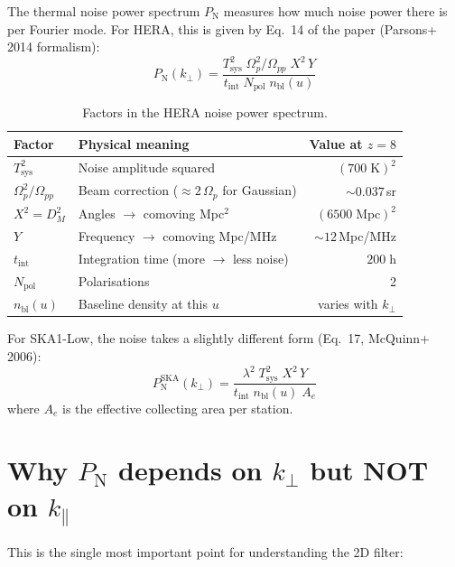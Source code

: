 \documentclass[11pt,a4paper]{article}
\newcommand{\kperp}{k_\perp}
\newcommand{\kpar}{k_\parallel}
\newcommand{\Tsys}{T_\mathrm{sys}}
\newcommand{\Pnoise}{P_\mathrm{N}}
\newcommand{\nbl}{n_\mathrm{bl}}
\begin{document}
The thermal noise power spectrum $\Pnoise$ measures how much noise power there is per Fourier mode. For HERA, this is given by Eq.~14 of the paper (Parsons+ 2014 formalism):
\begin{equation}\label{eq:pnoise}
    \boxed{
    \Pnoise(\kperp) = \frac{\Tsys^2\;\Omega_p^2/\Omega_{pp}\; X^2\, Y}{t_\mathrm{int}\; N_\mathrm{pol}\; \nbl(u)}
    }
\end{equation}

\begin{table}[h]
\centering
\begin{tabular}{llr}
\toprule
Factor & Physical meaning & Value at $z=8$ \\
\midrule
$\Tsys^2$ & Noise amplitude squared & $(700\;\mathrm{K})^2$ \\
$\Omega_p^2/\Omega_{pp}$ & Beam correction ($\approx 2\,\Omega_p$ for Gaussian) & $\sim 0.037$\,sr \\
$X^2 = D_M^2$ & Angles $\to$ comoving Mpc$^2$ & $(6500\;\mathrm{Mpc})^2$ \\
$Y$ & Frequency $\to$ comoving Mpc/MHz & $\sim 12$\,Mpc/MHz \\
$t_\mathrm{int}$ & Integration time (more $\to$ less noise) & $200\;\mathrm{h}$ \\
$N_\mathrm{pol}$ & Polarisations & 2 \\
$\nbl(u)$ & Baseline density at this $u$ & varies with $\kperp$ \\
\bottomrule
\end{tabular}
\caption{Factors in the HERA noise power spectrum.}
\end{table}

For SKA1-Low, the noise takes a slightly different form (Eq.~17, McQuinn+ 2006):
\begin{equation}
    \Pnoise^\mathrm{SKA}(\kperp) = \frac{\lambda^2\;\Tsys^2\; X^2\, Y}{t_\mathrm{int}\; \nbl(u)\; A_e}
\end{equation}
where $A_e$ is the effective collecting area per station.

\section{Why $\Pnoise$ depends on $\kperp$ but NOT on $\kpar$}

This is the single most important point for understanding the 2D filter:
\end{document}
